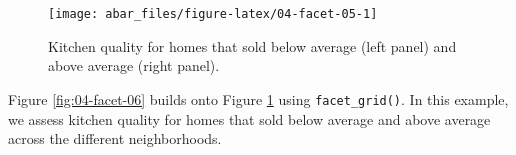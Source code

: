 \documentclass[]{book}
\newenvironment{Shaded}{\begin{snugshade}}{\end{snugshade}}
\newcommand{\DataTypeTok}[1]{\textcolor[rgb]{0.13,0.29,0.53}{#1}}
\newcommand{\KeywordTok}[1]{\textcolor[rgb]{0.13,0.29,0.53}{\textbf{#1}}}
\newcommand{\NormalTok}[1]{#1}
\newcommand{\OperatorTok}[1]{\textcolor[rgb]{0.81,0.36,0.00}{\textbf{#1}}}
\newcommand{\StringTok}[1]{\textcolor[rgb]{0.31,0.60,0.02}{#1}}
\theoremstyle{definition}
\theoremstyle{definition}
\theoremstyle{definition}
\theoremstyle{remark}
\begin{document}
\begin{Shaded}
\end{Shaded}

\begin{figure}

{\centering \texttt{[image: abar\_files/figure-latex/04-facet-05-1]} 

}

\caption{Kitchen quality for homes that sold below average (left panel) and above average (right panel).}\label{fig:04-facet-05}
\end{figure}

Figure \ref{fig:04-facet-06} builds onto Figure \ref{fig:04-facet-05}
using \texttt{facet\_grid()}. In this example, we assess kitchen quality
for homes that sold below average and above average across the different
neighborhoods.
\end{document}
